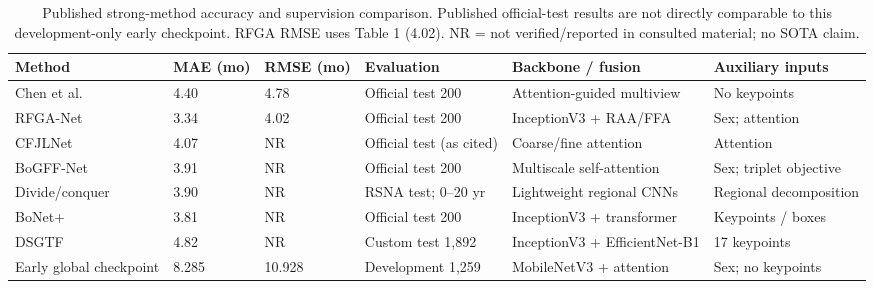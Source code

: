 \begin{table}[!t]
\centering\footnotesize
\caption{Published strong-method accuracy and supervision comparison. Published official-test results are not directly comparable to this development-only early checkpoint. RFGA RMSE uses Table 1 (4.02). NR = not verified/reported in consulted material; no SOTA claim.}
\label{tab:prelim_sota_accuracy}
\begin{tabularx}{\textwidth}{@{}p{31mm}XXXXX@{}}
\toprule
Method & MAE (mo) & RMSE (mo) & Evaluation & Backbone / fusion & Auxiliary inputs \\
\midrule
Chen et al.~\cite{chen} & 4.40 & 4.78 & Official test 200 & Attention-guided multiview & No keypoints \\
RFGA-Net~\cite{rfga} & 3.34 & 4.02 & Official test 200 & InceptionV3 + RAA/FFA & Sex; attention \\
CFJLNet~\cite{cfjl} & 4.07 & NR & Official test (as cited) & Coarse/fine attention & Attention \\
BoGFF-Net~\cite{bogff} & 3.91 & NR & Official test 200 & Multiscale self-attention & Sex; triplet objective \\
Divide/conquer~\cite{lightweight} & 3.90 & NR & RSNA test; 0--20 yr & Lightweight regional CNNs & Regional decomposition \\
BoNet+~\cite{bonetplus} & 3.81 & NR & Official test 200 & InceptionV3 + transformer & Keypoints / boxes \\
DSGTF~\cite{stage} & 4.82 & NR & Custom test 1,892 & InceptionV3 + EfficientNet-B1 & 17 keypoints \\
Early global checkpoint & 8.285 & 10.928 & Development 1,259 & MobileNetV3 + attention & Sex; no keypoints \\
\bottomrule
\end{tabularx}
\end{table}